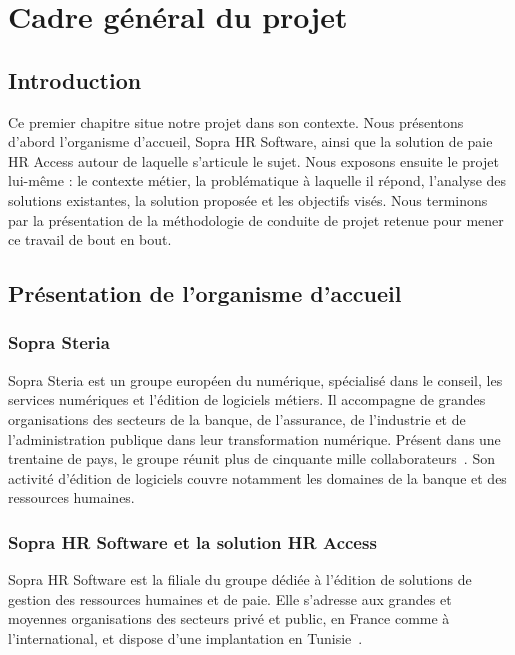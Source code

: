 \chapter{Cadre général du projet}
\label{ch:cadre}
\startcontents[chapters]
\chapterplan

\section{Introduction}

Ce premier chapitre situe notre projet dans son contexte. Nous présentons d'abord l'organisme d'accueil, Sopra HR Software, ainsi que la solution de paie HR Access autour de laquelle s'articule le sujet. Nous exposons ensuite le projet lui-même : le contexte métier, la problématique à laquelle il répond, l'analyse des solutions existantes, la solution proposée et les objectifs visés. Nous terminons par la présentation de la méthodologie de conduite de projet retenue pour mener ce travail de bout en bout.

\section{Présentation de l'organisme d'accueil}

\subsection{Sopra Steria}

Sopra Steria est un groupe européen du numérique, spécialisé dans le conseil, les services numériques et l'édition de logiciels métiers. Il accompagne de grandes organisations des secteurs de la banque, de l'assurance, de l'industrie et de l'administration publique dans leur transformation numérique. Présent dans une trentaine de pays, le groupe réunit plus de cinquante mille collaborateurs~\cite{soprasteria}. Son activité d'édition de logiciels couvre notamment les domaines de la banque et des ressources humaines.

\subsection{Sopra HR Software et la solution HR Access}

Sopra HR Software est la filiale du groupe dédiée à l'édition de solutions de gestion des ressources humaines et de paie. Elle s'adresse aux grandes et moyennes organisations des secteurs privé et public, en France comme à l'international, et dispose d'une implantation en Tunisie~\cite{soprahr}.


